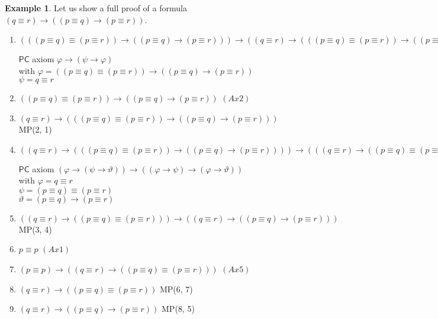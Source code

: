 \documentclass{article}
\theoremstyle{definition}
\theoremstyle{definition}
\newtheorem{example}{Example}[section]
\newcommand*{\id}{\equiv}
\newcommand*{\ra}{\rightarrow}
\newcommand{\PC}{$\mathsf{PC}$\xspace}
\begin{document}
\begin{example}
    Let us show a full proof of a formula $(q \id r) \ra ((p \id q) \ra (p \id r))$.

    \begin{enumerate}
        \item $(((p \id q) \id (p \id r)) \ra ((p \id q) \ra (p \id r))) \ra ((q \id r) \ra (((p \id q) \id (p \id r)) \ra ((p \id q) \ra (p \id r)))) $
              \begin{flushright} \PC axiom $\varphi \ra (\psi \ra \varphi)$ \\
                  with $\varphi = ((p \id q) \id (p \id r)) \ra ((p \id q) \ra (p \id r))$\\
                  $\psi = q \id r$
              \end{flushright}
        \item $((p \id q) \id (p \id r)) \ra ((p \id q) \ra (p \id r))  $ \hfill $(Ax2)$
        \item $(q \id r) \ra (((p \id q) \id (p \id r)) \ra ((p \id q) \ra (p \id r)))$ \hfill MP(2, 1)
        \item $((q \id r) \ra (((p \id q) \id (p \id r)) \ra ((p \id q) \ra (p \id r)))) \ra (((q \id r) \ra ((p \id q) \id (p \id r))) \ra ((q \id r) \ra ((p \id q) \ra (p \id r)))) $ \begin{flushright}
                  \PC axiom $(\varphi \ra (\psi \ra \vartheta)) \ra ((\varphi \ra \psi) \ra (\varphi \ra \vartheta))$ \\
                  with $\varphi = q \id r$ \\
                  $\psi = (p \id q) \id (p \id r)$ \\
                  $\vartheta = (p \id q) \ra (p \id r)$
              \end{flushright}
        \item $((q \id r) \ra ((p \id q) \id (p \id r))) \ra ((q \id r) \ra ((p \id q) \ra (p \id r))) $ \hfill MP(3, 4)
        \item $p \id p $ \hfill $(Ax1)$
        \item $(p \id p) \ra ((q \id r) \ra ((p \id q) \id (p \id r)))$ \hfill $(Ax5)$
        \item $(q \id r) \ra ((p \id q) \id (p \id r))$ \hfill MP(6, 7)
        \item $(q \id r) \ra ((p \id q) \ra (p \id r))$ \hfill MP(8, 5)
    \end{enumerate}
\end{example}
\end{document}
